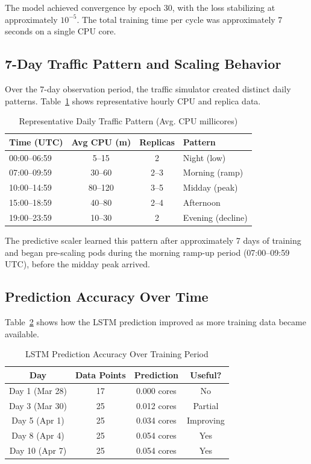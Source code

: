 \documentclass[journal]{IEEEtran}
\begin{document}
The model achieved convergence by epoch 30, with the loss stabilizing at approximately $10^{-5}$. The total training time per cycle was approximately 7 seconds on a single CPU core.

\subsection{7-Day Traffic Pattern and Scaling Behavior}
Over the 7-day observation period, the traffic simulator created distinct daily patterns. Table~\ref{tab:7day} shows representative hourly CPU and replica data.

\begin{table}[h]
\centering
\caption{Representative Daily Traffic Pattern (Avg. CPU millicores)}
\label{tab:7day}
\begin{tabular}{@{}lccl@{}}
\toprule
\textbf{Time (UTC)} & \textbf{Avg CPU (m)} & \textbf{Replicas} & \textbf{Pattern} \\
\midrule
00:00--06:59 & 5--15 & 2 & Night (low) \\
07:00--09:59 & 30--60 & 2--3 & Morning (ramp) \\
10:00--14:59 & 80--120 & 3--5 & Midday (peak) \\
15:00--18:59 & 40--80 & 2--4 & Afternoon \\
19:00--23:59 & 10--30 & 2 & Evening (decline) \\
\bottomrule
\end{tabular}
\end{table}

The predictive scaler learned this pattern after approximately 7 days of training and began pre-scaling pods during the morning ramp-up period (07:00--09:59 UTC), before the midday peak arrived.

\subsection{Prediction Accuracy Over Time}
Table~\ref{tab:accuracy} shows how the LSTM prediction improved as more training data became available.

\begin{table}[h]
\centering
\caption{LSTM Prediction Accuracy Over Training Period}
\label{tab:accuracy}
\begin{tabular}{@{}cccc@{}}
\toprule
\textbf{Day} & \textbf{Data Points} & \textbf{Prediction} & \textbf{Useful?} \\
\midrule
Day 1 (Mar 28) & 17 & 0.000 cores & No \\
Day 3 (Mar 30) & 25 & 0.012 cores & Partial \\
Day 5 (Apr 1) & 25 & 0.034 cores & Improving \\
Day 8 (Apr 4) & 25 & 0.054 cores & Yes \\
Day 10 (Apr 7) & 25 & 0.054 cores & Yes \\
\bottomrule
\end{tabular}
\end{table}
\end{document}

